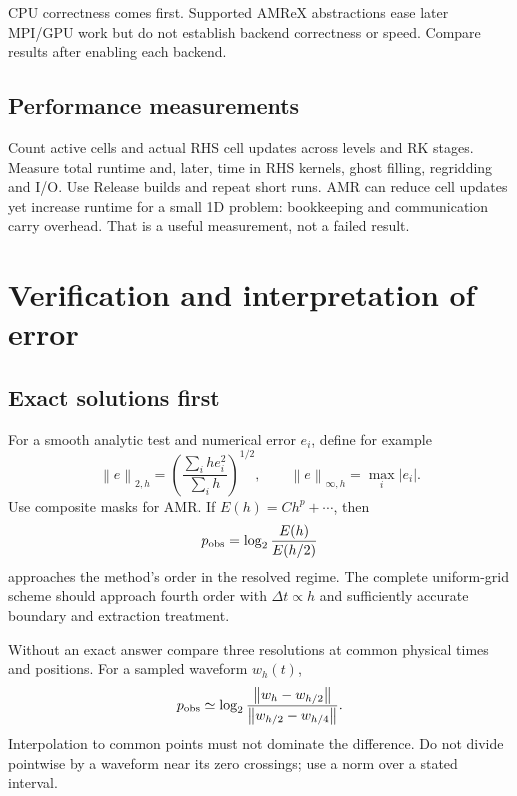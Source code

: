 \documentclass[11pt,a4paper]{article}
\numberwithin{equation}{section}
\newcommand{\norm}[1]{\left\lVert#1\right\rVert}
\begin{document}
CPU correctness comes first. Supported AMReX abstractions ease later
MPI/GPU work but do not establish backend correctness or speed.
Compare results after enabling each backend.

\subsection{Performance measurements}
Count active cells and actual RHS cell updates across levels and RK stages.
Measure total runtime and, later, time in RHS kernels, ghost filling,
regridding and I/O. Use Release builds and repeat short runs.
AMR can reduce cell updates yet increase runtime for a small 1D problem:
bookkeeping and communication carry overhead. That is a useful measurement,
not a failed result.

\section{Verification and interpretation of error}\label{sec:verification}

\subsection{Exact solutions first}
For a smooth analytic test and numerical error $e_i$, define for example
\begin{equation}
 \norm{e}_{2,h}=
 \left(\frac{\sum_i h e_i^2}{\sum_i h}\right)^{1/2},\qquad
 \norm{e}_{\infty,h}=\max_i|e_i|.
\end{equation}
Use composite masks for AMR. If $E(h)=Ch^p+\cdots$, then
\begin{equation}
 p_{\rm obs}=\log_2\frac{E(h)}{E(h/2)}
\end{equation}
approaches the method's order in the resolved regime. The complete
uniform-grid scheme should approach fourth order with $\Delta t\propto h$
and sufficiently accurate boundary and extraction treatment.

Without an exact answer compare three resolutions at common physical
times and positions. For a sampled waveform $w_h(t)$,
\begin{equation}
 p_{\rm obs}\simeq
 \log_2\frac{\norm{w_h-w_{h/2}}}{\norm{w_{h/2}-w_{h/4}}}.
\end{equation}
Interpolation to common points must not dominate the difference.
Do not divide pointwise by a waveform near its zero crossings; use a
norm over a stated interval.
\end{document}
